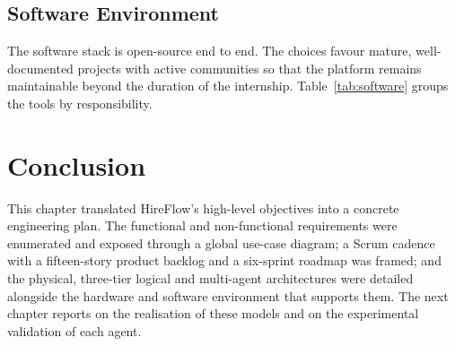\clearpage
\subsection{Software Environment}

The software stack is open-source end to end. The choices favour
mature, well-documented projects with active communities so that the
platform remains maintainable beyond the duration of the internship.
Table~\ref{tab:software} groups the tools by responsibility.

\begin{table}[H]
    \centering
    {\renewcommand{\arraystretch}{1.05}%
    }
    \caption{Software environment used during the internship.}
    \label{tab:software}
\end{table}

\section*{Conclusion}

This chapter translated HireFlow's high-level objectives into a
concrete engineering plan. The functional and non-functional
requirements were enumerated and exposed through a global use-case
diagram; a Scrum cadence with a fifteen-story product backlog and
a six-sprint roadmap was framed; and the physical, three-tier
logical and multi-agent architectures were detailed alongside the
hardware and software environment that supports them. The next
chapter reports on the realisation of these models and on the
experimental validation of each agent.
